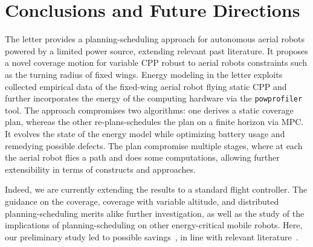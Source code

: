 \documentclass[letterpaper,10pt,journal,twoside]{IEEEtran}
\newcommand{\stt}[1]{{\small\tt #1}} %
\newcommand{\powprof}{\stt{powprofiler}}
\theoremstyle{definition}
\begin{document}
\section{Conclusions and Future Directions}  %
\label{sec:conclusion}                       %
The letter provides a planning-scheduling approach for autonomous aerial robots powered by a limited power source, extending relevant past literature. It proposes a novel coverage motion for variable CPP robust to aerial robots constraints such as the turning radius of fixed wings. Energy modeling in the letter exploits collected empirical data of the fixed-wing aerial robot flying static CPP and further incorporates the energy of the computing hardware via the \powprof{} tool. The approach compromises two algorithms: one derives a static coverage plan, whereas the other re-plans-schedules the plan on a finite horizon via MPC. It evolves the state of the energy model while optimizing battery usage and remedying possible defects. The plan compromise multiple stages, where at each the aerial robot flies a path and does some computations, allowing further extensibility in terms of constructs and approaches.

Indeed, we are currently extending the results to a standard flight controller. The guidance on the coverage, coverage with variable altitude, %
and distributed planning-scheduling merits alike further investigation, as well as the study of the implications of planning-scheduling on other energy-critical mobile robots. Here, our preliminary study led to possible savings~\cite{seewald2020beyond}, in line with relevant literature~\cite{ondruska2015scheduled,lahijanian2018resource}.







{\small  %
}             %

\appendices

\renewcommand{\thesectiondis}[2]{\Alph{section}:}

\vspace*{-1ex}
\end{document}
